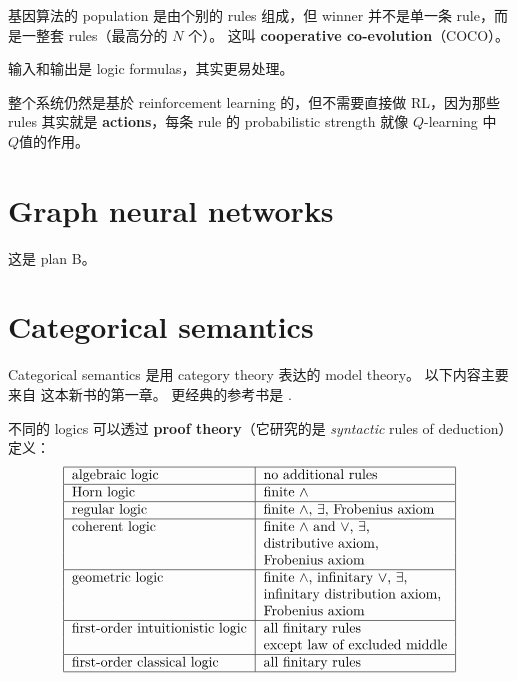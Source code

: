 \documentclass[12pt, orivec]{article}
\begin{document}
基因算法的 population 是由个别的 rules 组成，但 winner 并不是单一条 rule，而是一整套 rules（最高分的 $N$ 个）。 这叫 \textbf{cooperative co-evolution}（COCO）。  

输入和输出是 logic formulas，其实更易处理。 

整个系统仍然是基於 reinforcement learning 的，但不需要直接做 RL，因为那些 rules 其实就是 \textbf{actions}，每条 rule  的 probabilistic strength 就像 $Q$-learning 中 $Q$值的作用。 

\section{Graph neural networks}

这是 plan {\color{red} B}。  

\section{Categorical semantics}
\label{Categorical-semantics}

Categorical semantics 是用 category theory 表达的 model theory。  以下内容主要来自 \parencite{Caramello2018} 这本新书的第一章。  更经典的参考书是 \parencite{Goldblatt2006}. 

不同的 logics 可以透过 \textbf{proof theory}（它研究的是 \textit{syntactic} rules of deduction）定义：
\begin{equation}
\begin{tabular}{|l|l|}
\hline
algebraic logic & no additional rules\\
\hline
Horn logic & finite $\wedge$ \\
\hline
regular logic & finite $\wedge$, $\exists$, Frobenius axiom\\
\hline
coherent logic & finite $\wedge$ and $\vee$, $\exists$,\\
				& distributive axiom, \\
				& Frobenius axiom \\
\hline
geometric logic & finite $\wedge$, infinitary $\vee$, $\exists$,\\
				& infinitary distribution axiom,\\
				& Frobenius axiom \\
\hline
first-order intuitionistic logic & all finitary rules \\
				& except law of excluded middle\\
\hline
first-order classical logic & all finitary rules \\
\hline
\end{tabular}
\end{equation}
\end{document}
